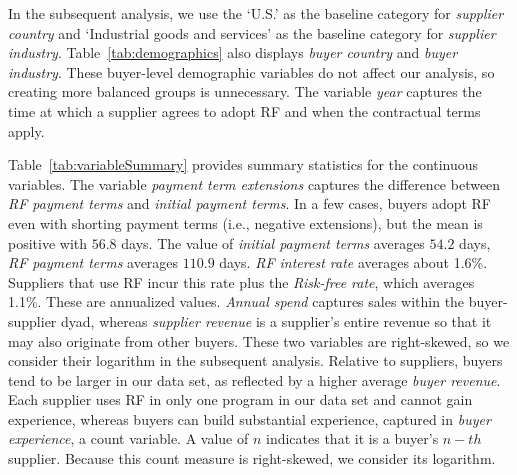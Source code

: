 \documentclass[A4,11pt]{article}
\renewcommand{\~}[1]{\tilde{#1}}
\renewcommand{\-}[1]{\overline{#1}}
\begin{document}
\FloatBarrier

In the subsequent analysis, we use the `U.S.' as the baseline category for \textit{supplier country} and `Industrial goods and services' as the baseline category for \textit{supplier industry}. Table~\ref{tab:demographics} also displays \textit{buyer country} and \textit{buyer industry}. These buyer-level demographic variables do not affect our analysis, so creating more balanced groups is unnecessary. The variable \textit{year} captures the time at which a supplier agrees to adopt RF and when the contractual terms apply.

Table~\ref{tab:variableSummary} provides summary statistics for the continuous variables. The variable \textit{payment term extensions} captures the difference between \textit{RF payment terms} and \textit{initial payment terms}. In a few cases, buyers adopt RF even with shorting payment terms (i.e., negative extensions), but the mean is positive with $56.8$ days. The value of \textit{initial payment terms} averages $54.2$ days, \textit{RF payment terms} averages $110.9$ days. \textit{RF interest rate} averages about 1.6\%. Suppliers that use RF incur this rate plus the \textit{Risk-free rate}, which averages 1.1\%. These are annualized values. \textit{Annual spend} captures sales within the buyer-supplier dyad, whereas \textit{supplier revenue} is a supplier's entire revenue so that it may also originate from other buyers. These two variables are right-skewed, so we consider their logarithm in the subsequent analysis. Relative to suppliers, buyers tend to be larger in our data set, as reflected by a higher average \textit{buyer revenue}. Each supplier uses RF in only one program in our data set and cannot gain experience, whereas buyers can build substantial experience, captured in \textit{buyer experience}, a count variable. A value of $n$ indicates that it is a buyer's $n-th$ supplier. Because this count measure is right-skewed, we consider its logarithm.%
\end{document}
